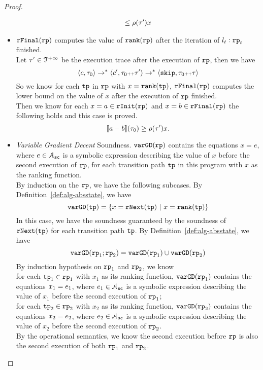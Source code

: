 \begin{proof}
\begin{itemize}
\[\begin{array}{l}
     \leq \rho(\mathtt{\tau}') x
   \end{array}
   \]
 \item $\mathtt{rFinal}(\mathtt{rp})$ computes the value of $\mathtt{rank}(\mathtt{rp})$ after the iteration of $l_t:\mathtt{rp}_t$ finished.
 \\
 Let $\mathtt{\tau}' \in \mathcal{T}^{+\infty}$ be the execution trace after the execution of $\mathtt{rp}$,  then we have
 \[
   \langle c, \mathtt{\tau}_0 \rangle \to^* \langle c', \mathtt{\tau}_0 {\scriptscriptstyle ++} \mathtt{\tau}' \rangle \to^* \langle \mathtt{skip}, \mathtt{\tau}_0 {\scriptscriptstyle ++} \mathtt{\tau} \rangle
 \]
So we know for each $\mathtt{tp}$ in $\mathtt{rp}$ with $x = \mathtt{rank}(\mathtt{tp})$,
$\mathtt{rFinal}(\mathtt{rp})$ computes the lower bound on the value of $x$ after the execution of $\mathtt{rp}$ finished.
\\
Then we know for each $ x = a \in \mathtt{rInit}(\mathtt{rp}) $ and $ x = b \in \mathtt{rFinal}(\mathtt{rp}) $
the following holds and this case is proved.
\[
  \llbracket a - b \rrbracket(\mathtt{\tau}_0) \geq \rho(\mathtt{\tau}') x.
\]
\item   \emph{Variable Gradient Decent} Soundness.
$\mathtt{varGD}(\mathtt{rp})$ contains the equations $x = e$, where $e \in \mathcal{A}_{\mathtt{sc}}$ is a
  symbolic expression describing the value of $x$ before the second execution of $\mathtt{rp}$,
  for each transition path $\mathtt{tp}$ in this program with $x$ as the ranking function.
\\
 By induction on the $\mathtt{rp}$, we have the following subcases.
 \subcaseL{$\rprog = \tpath$}
 By Definition~\ref{def:alg-absstate}, we have
\[
   \varGD(\tpath) =  \left\{x = \rfnext(\tpath) ~|~ x = \locbound(\tpath) \right\}
\]
In this case, we have the soundness guaranteed by the soundness of $\mathtt{rNext}(\mathtt{tp})$ for each transition path $\mathtt{tp}$.
 By Definition~\ref{def:alg-absstate}, we have
\[
\mathtt{varGD}(\mathtt{rp}_1;\mathtt{rp}_2) =  \mathtt{varGD}(\mathtt{rp}_1) \cup \mathtt{varGD}(\mathtt{rp}_2)
\]
By induction hypothesis on $\mathtt{rp}_1$ and $\mathtt{rp}_2$, we know
\\
for each $\mathtt{tp}_1 \in \mathtt{rp}_1$ with $x_1$ as its ranking function,
$\mathtt{varGD}(\mathtt{rp}_1)$ contains the equations $x_1 = e_1$, where $e_1 \in \mathcal{A}_{\mathtt{sc}}$ is a
symbolic expression describing the value of $x_1$ before the second execution of $\mathtt{rp}_1$;
\\
for each $\mathtt{tp}_2 \in \mathtt{rp}_2$ with $x_2$ as its ranking function,
$\mathtt{varGD}(\mathtt{rp}_2)$ contains the equations $x_2 = e_2$, where $e_2 \in \mathcal{A}_{\mathtt{sc}}$ is a
symbolic expression describing the value of $x_2$ before the second execution of $\mathtt{rp}_2$.
\\
By the operational semantics, we know the second execution before $\mathtt{rp}$ is also the second execution of both $\mathtt{rp}_1$ and $\mathtt{rp}_2$.

\end{itemize}
\end{proof}

